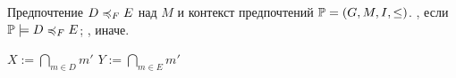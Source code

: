 		\begin{algorithm}
			\caption{$(\DEF, \PP)$ \cite[Алг.~2]{Obiedkov:2013}}
			\label{algo:check}
			\begin{algorithmic}[1]
				\REQUIRE Предпочтение $D \preccurlyeq_{F} E$ над $M$ и контекст предпочтений $\mathbb{P} = (G, M, I, \leq)$.%
				\ENSURE \TRUE, если $\mathbb{P} \models D \preccurlyeq_{F} E$; \FALSE, иначе.
				\item[]
				\STATE $X := \bigcap_{m \in D}m'$
				\STATE $Y := \bigcap_{m \in E}m'$
				\RETURN \FALSE
				\ENDIF
				\ENDFOR
				\ENDFOR
				\RETURN \TRUE
			\end{algorithmic}
		\end{algorithm}
		